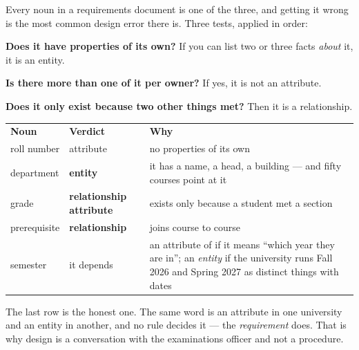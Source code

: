 \begin{examplebox}
Every noun in a requirements document is one of the three, and getting it wrong
is the most common design error there is. Three tests, applied in order:

\begin{tight}
  \item \textbf{Does it have properties of its own?} If you can list two or
        three facts \emph{about} it, it is an entity.
  \item \textbf{Is there more than one of it per owner?} If yes, it is not an
        attribute.
  \item \textbf{Does it only exist because two other things met?} Then it is a
        relationship.
\end{tight}

\medskip
\begin{tabular}{@{}L{3.3cm}L{2.5cm}L{8.1cm}@{}}
\textbf{Noun} & \textbf{Verdict} & \textbf{Why} \\
roll number   & attribute    & no properties of its own \\
department    & \textbf{entity} & it has a name, a head, a building --- and
                                 fifty courses point at it \\
grade         & \textbf{relationship attribute} & exists only because a
                                 student met a section \\
prerequisite  & \textbf{relationship} & joins course to course \\
semester      & it depends  & an attribute of  if it means
                              ``which year they are in''; an \emph{entity} if
                              the university runs Fall 2026 and Spring 2027 as
                              distinct things with dates \\
\end{tabular}

\smallskip
The last row is the honest one. The same word is an attribute in one
university and an entity in another, and no rule decides it --- the
\emph{requirement} does. That is why design is a conversation with the
examinations officer and not a procedure.
\end{examplebox}

